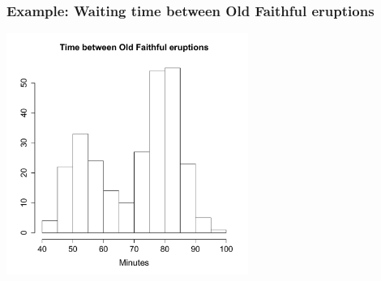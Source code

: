 \documentclass{beamer}
\begin{document}


\begin{frame}
  \frametitle{Example: Waiting time between Old Faithful eruptions}

\begin{center}
\includegraphics[height=3.1in]{waitingtime.pdf}
\end{center}

\end{frame}
\end{document}
